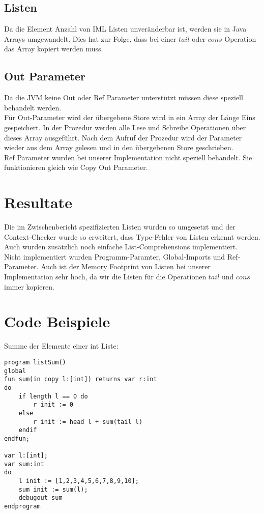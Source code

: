 \documentclass[a4paper,notitlepage,oneside]{article}
\begin{document}
\subsection{Listen}
Da die Element Anzahl von IML Listen unveränderbar ist, werden sie in Java Arrays umgewandelt.
Dies hat zur Folge, dass bei einer $tail$ oder $cons$ Operation das Array kopiert werden muss.

\subsection{Out Parameter}
Da die JVM keine Out oder Ref Parameter unterstützt müssen diese speziell behandelt werden. \\
Für Out-Parameter wird der übergebene Store wird in ein Array der Länge Eins gespeichert. In der Prozedur werden alle Lese und Schreibe Operationen über dieses Array ausgeführt. Nach dem Aufruf der Prozedur wird der Parameter wieder aus dem Array gelesen und in den übergebenen Store geschrieben. \\
Ref Parameter wurden bei unserer Implementation nicht speziell behandelt. Sie funktionieren gleich wie Copy Out Parameter.

\section{Resultate}
Die im Zwischenbericht spezifizierten Listen wurden so umgesetzt und der Context-Checker wurde so erweitert, dass Type-Fehler von Listen erkennt werden. Auch wurden zusätzlich noch einfache List-Comprehensions implementiert.\\ Nicht implementiert wurden Programm-Paramter, Global-Imports und Ref-Parameter. Auch ist der Memory Footprint von Listen bei unserer Implementation sehr hoch, da wir die Listen für die Operationen $tail$ und $cons$ immer kopieren.

\newpage
\section{Code Beispiele}
Summe der Elemente einer int Liste:
\begin{lstlisting}[language=iml, caption=Beispiel für die Berechnung der Summe der Element einer Liste in IML]
program listSum()
global
fun sum(in copy l:[int]) returns var r:int
do
	if length l == 0 do
		r init := 0
	else
		r init := head l + sum(tail l)
	endif
endfun;

var l:[int];
var sum:int
do
	l init := [1,2,3,4,5,6,7,8,9,10];
	sum init := sum(l);
	debugout sum
endprogram
\end{lstlisting}
\end{document}
